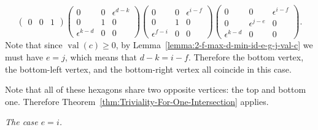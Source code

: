 \documentclass{amsart}
\theoremstyle{definition}
\def\e{\epsilon}
\def\val{\mathop{\mathrm{val}}}
\newenvironment{caselist}
	       {\begin{list}{\underline{Case \arabic{enumi}}:}
		   {\usecounter{enumi}
		     \setlength{\itemindent}{0.5in}
		     \setlength{\leftmargin}{0in}
		     \setlength{\rightmargin}{0in}
	       }}
	       {\end{list}}
\newcommand\subsubsubsection[1]{\vspace{0.5em}\begin{paragraph}{}\noindent \normalfont\large\itshape #1. \end{paragraph}\vspace{0.5em}}
\begin{document}
\begin{caselist}
\begin{equation*}
{\begin{pmatrix}
		0 & 0 & 1
              \end{pmatrix}
	    }
	    {
              \begin{pmatrix}
		0 & 0 & \e^{d - k} \\ 
		0 & 1 & 0 \\
		\e^{k-d} & 0 & 0
              \end{pmatrix}
	    }       
	    {
              \begin{pmatrix}
		0 & 0 & \e^{i-f} \\ 
		0 & 1 & 0 \\
		\e^{f-i} & 0 & 0
              \end{pmatrix}
	    }
	    {\begin{pmatrix}
		0 & 0 & \e^{i-f} \\
		0 & \e^{j - e} & 0 \\
		\e^{k-d} & 0 & 0
	    \end{pmatrix}}.
      \end{equation*}
      Note that since $\val(c) \ge 0$, by
      Lemma~\ref{lemma:2-f-max-d-min-id-e-g-j-val-c} we must have $e = j$,
      which means that $d-k = i-f$.  Therefore the bottom vertex, the
      bottom-left vertex, and the bottom-right vertex all coincide in this
      case.
  \end{caselist}
  Note that all of these hexagons share two opposite vertices: the top and
  bottom one.  Therefore Theorem~\ref{thm:Triviality-For-One-Intersection}
  applies.

  \subsubsubsection{The case $e = i$}
\end{document}

